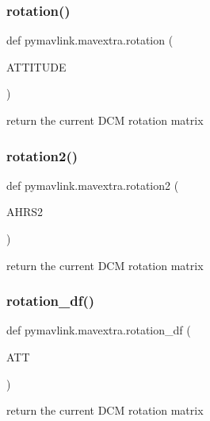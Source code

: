 \subsubsection{\texorpdfstring{rotation()}{rotation()}}
{\footnotesize\ttfamily def pymavlink.\+mavextra.\+rotation (\begin{DoxyParamCaption}\item[{}]{A\+T\+T\+I\+T\+U\+DE }\end{DoxyParamCaption})}

\begin{DoxyVerb}return the current DCM rotation matrix\end{DoxyVerb}
 \mbox{\label{namespacepymavlink_1_1mavextra_abaf31a27857e3a949ad5166c35d11773}} 
\subsubsection{\texorpdfstring{rotation2()}{rotation2()}}
{\footnotesize\ttfamily def pymavlink.\+mavextra.\+rotation2 (\begin{DoxyParamCaption}\item[{}]{A\+H\+R\+S2 }\end{DoxyParamCaption})}

\begin{DoxyVerb}return the current DCM rotation matrix\end{DoxyVerb}
 \mbox{\label{namespacepymavlink_1_1mavextra_a8d3483c735e242ad8bb46001dae2284a}} 
\subsubsection{\texorpdfstring{rotation\+\_\+df()}{rotation\_df()}}
{\footnotesize\ttfamily def pymavlink.\+mavextra.\+rotation\+\_\+df (\begin{DoxyParamCaption}\item[{}]{A\+TT }\end{DoxyParamCaption})}

\begin{DoxyVerb}return the current DCM rotation matrix\end{DoxyVerb}
 \mbox{\label{namespacepymavlink_1_1mavextra_a55bf23fb8b11c2e546dddb4eab80eae0}} 
